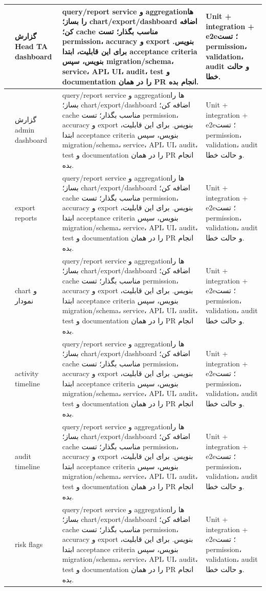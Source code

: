 \documentclass[11pt,a4paper]{article}
\begin{document}
\begin{longtable}{|>{\raggedleft\arraybackslash}p{}|>{\raggedleft\arraybackslash}p{}|>{\raggedleft\arraybackslash}p{}|>{\raggedleft\arraybackslash}p{}|}
252 & گزارش Head TA dashboard & query/report service و aggregationها را بساز؛ chart/export/dashboard اضافه کن؛ cache مناسب بگذار؛ تست permission، accuracy و export بنویس. برای این قابلیت، ابتدا acceptance criteria بنویس، سپس migration/schema، service، API، UI، audit، test و documentation را در همان PR انجام بده. & Unit + integration + e2e؛ تست permission، validation، audit و حالت خطا. \\ \hline
253 & گزارش admin dashboard & query/report service و aggregationها را بساز؛ chart/export/dashboard اضافه کن؛ cache مناسب بگذار؛ تست permission، accuracy و export بنویس. برای این قابلیت، ابتدا acceptance criteria بنویس، سپس migration/schema، service، API، UI، audit، test و documentation را در همان PR انجام بده. & Unit + integration + e2e؛ تست permission، validation، audit و حالت خطا. \\ \hline
254 & export reports & query/report service و aggregationها را بساز؛ chart/export/dashboard اضافه کن؛ cache مناسب بگذار؛ تست permission، accuracy و export بنویس. برای این قابلیت، ابتدا acceptance criteria بنویس، سپس migration/schema، service، API، UI، audit، test و documentation را در همان PR انجام بده. & Unit + integration + e2e؛ تست permission، validation، audit و حالت خطا. \\ \hline
255 & chart و نمودار & query/report service و aggregationها را بساز؛ chart/export/dashboard اضافه کن؛ cache مناسب بگذار؛ تست permission، accuracy و export بنویس. برای این قابلیت، ابتدا acceptance criteria بنویس، سپس migration/schema، service، API، UI، audit، test و documentation را در همان PR انجام بده. & Unit + integration + e2e؛ تست permission، validation، audit و حالت خطا. \\ \hline
256 & activity timeline & query/report service و aggregationها را بساز؛ chart/export/dashboard اضافه کن؛ cache مناسب بگذار؛ تست permission، accuracy و export بنویس. برای این قابلیت، ابتدا acceptance criteria بنویس، سپس migration/schema، service، API، UI، audit، test و documentation را در همان PR انجام بده. & Unit + integration + e2e؛ تست permission، validation، audit و حالت خطا. \\ \hline
257 & audit timeline & query/report service و aggregationها را بساز؛ chart/export/dashboard اضافه کن؛ cache مناسب بگذار؛ تست permission، accuracy و export بنویس. برای این قابلیت، ابتدا acceptance criteria بنویس، سپس migration/schema، service، API، UI، audit، test و documentation را در همان PR انجام بده. & Unit + integration + e2e؛ تست permission، validation، audit و حالت خطا. \\ \hline
258 & risk flags & query/report service و aggregationها را بساز؛ chart/export/dashboard اضافه کن؛ cache مناسب بگذار؛ تست permission، accuracy و export بنویس. برای این قابلیت، ابتدا acceptance criteria بنویس، سپس migration/schema، service، API، UI، audit، test و documentation را در همان PR انجام بده. & Unit + integration + e2e؛ تست permission، validation، audit و حالت خطا. \\ \hline

\end{longtable}
\end{document}
